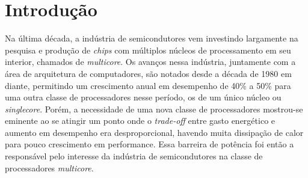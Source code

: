 
\newcommand{\multicore}{\textit{multicore}\xspace}
\newcommand{\chip}{\textit{chip}\xspace}
\newcommand{\chips}{\textit{chips}\xspace}
\newcommand{\singlecore}{\textit{singlecore}\xspace}
\newcommand{\tradeoff}{\textit{trade-off}\xspace}
\newcommand{\exaescale}{\textit{Exaescale}\xspace}
\newcommand{\greencomputing}{\textit{Green Computing}\xspace}  
\newcommand{\ranking}{\textit{ranking}\xspace}
\newcommand{\bench}{\textit{benchmark}\xspace}
\newcommand{\benchs}{\textit{benchmarks}\xspace}
\newcommand{\capb}{CAP Bench\xspace}
\newcommand{\etal}{\textit{et al}.\xspace}
\newcommand{\thread}{\textit{thread}\xspace}
\newcommand{\threads}{\textit{threads}\xspace}
\newcommand{\cache}{\textit{cache}\xspace}
\newcommand{\caches}{\textit{caches}\xspace}
\newcommand{\byte}{\textit{byte}\xspace}
\newcommand{\bytes}{\textit{bytes}\xspace}
\newcommand{\hardware}{\textit{hardware}\xspace}
\newcommand{\transistor}{\textit{transistor}\xspace}
\newcommand{\transistors}{\textit{transistors}\xspace}
\newcommand{\manycore}{\textit{manycore}\xspace}
\newcommand{\hardware}{\textit{hardware}\xspace}
\newcommand{\mppa}{MPPA-256\xspace}
\newcommand{\cluster}{\textit{cluster}\xspace}
\newcommand{\clusters}{\textit{clusters}\xspace}
\newcommand{\kernel}{\textit{kernel}\xspace}
\newcommand{\kernels}{\textit{kernels}\xspace}

\chapter{Introdução}
\label{ch:introdução}

Na última década, a indústria de semicondutores vem investindo largamente na pesquisa e produção de \chips com múltiplos núcleos de processamento em seu interior, chamados de \multicore. Os avanços nessa indústria, juntamente com a área de arquitetura de computadores, são notados desde a década de 1980 em diante, permitindo um crescimento anual em desempenho de 40\% a 50\% \cite{Larus2008} para uma outra classe de processadores nesse período, os de um único núcleo ou \singlecore. Porém, a necessidade de uma nova classe de processadores mostrou-se eminente ao se atingir um ponto onde o \tradeoff entre gasto energético e aumento em desempenho era desproporcional, havendo muita dissipação de calor para pouco crescimento em performance. Essa barreira de potência foi então a responsável pelo interesse da indústria de semicondutores na classe de processadores \multicore. 

